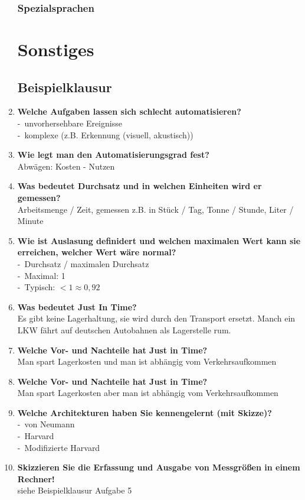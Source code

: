 \documentclass[a4paper,12pt]{article}
\newcommand{\questionnopage}[2]{\pagebreak[3]\item {\textbf{#1?}}#2}
\newcommand{\statementnopage}[2]{\pagebreak[3]\item {\textbf{#1!}}#2}
\newcommand{\catchword}[1]{\\-\ #1}
\newcommand{\normaltext}[1]{\\#1}
\begin{document}
\begin{enumerate}
  \subsubsection{Spezialsprachen}

  \newpage
  \section{Sonstiges}

  \subsection{Beispielklausur}
  
  \questionnopage{Welche Aufgaben lassen sich schlecht automatisieren}
  {
    \catchword{unvorhersehbare Ereignisse}
    \catchword{komplexe (z.B. Erkennung (visuell, akustisch))}
  }

  \questionnopage{Wie legt man den Automatisierungsgrad fest}
  {
    \normaltext{Abwägen: Kosten - Nutzen}
  }

  \questionnopage{Was bedeutet Durchsatz und in welchen Einheiten wird er gemessen}
  {
    \normaltext{Arbeitsmenge / Zeit, gemessen z.B. in Stück / Tag, Tonne / Stunde, Liter / Minute}
  }

  \questionnopage{Wie ist Auslasung definidert und welchen maximalen Wert kann sie erreichen,
                  welcher Wert wäre normal}
  {
    \catchword{Durchsatz / maximalen Durchsatz}
    \catchword{Maximal: 1}
    \catchword{Typisch: $ <1 \approx 0,92$}
  }

  \questionnopage{Was bedeutet Just In Time}
  {
    \normaltext{Es gibt keine Lagerhaltung, sie wird durch den Transport ersetzt. Manch ein
                LKW fährt auf deutschen Autobahnen als Lagerstelle rum.}
  }

  \questionnopage{Welche Vor- und Nachteile hat Just in Time}
  {
    \normaltext{Man spart Lagerkosten und man ist abhängig vom Verkehrsaufkommen}
  }

  \questionnopage{Welche Vor- und Nachteile hat Just in Time}
  {
    \normaltext{Man spart Lagerkosten aber man ist abhängig vom Verkehrsaufkommen}
  }
  
  \questionnopage{Welche Architekturen haben Sie kennengelernt (mit Skizze)}
  {
    \catchword{von Neumann}
    \catchword{Harvard}
    \catchword{Modifizierte Harvard}
  }
  
  \statementnopage{Skizzieren Sie die Erfassung und Ausgabe von Messgrößen in einem Rechner}
  {
  \normaltext{siehe Beispielklausur Aufgabe 5}
  }
  

\end{enumerate}
\end{document}
